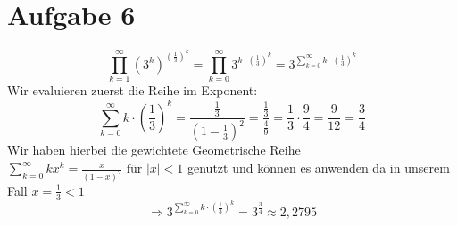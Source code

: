 \section{Aufgabe 6}
$$\prod_{k=1}^{\infty}(3^{k})^{(\frac{1}{3})^k}=\prod_{k=0}^{\infty}3^{k\cdot(\frac{1}{3})^k}=3^{\sum_{k=0}^{\infty}k\cdot(\frac{1}{3})^k}$$
Wir evaluieren zuerst die Reihe im Exponent:
$$\sum_{k=0}^{\infty}k\cdot(\frac{1}{3})^k=\frac{\frac{1}{3}}{(1-\frac{1}{3})^2}=\frac{\frac{1}{3}}{\frac{4}{9}}=\frac{1}{3}\cdot \frac{9}{4}=\frac{9}{12}=\frac{3}{4}$$
Wir haben hierbei die gewichtete Geometrische Reihe $\sum_{k=0}^{\infty}kx^k=\frac{x}{(1-x)^2} \text{ für } |x| < 1$ genutzt und können es anwenden da in unserem Fall $x=\frac{1}{3}<1$
$$\Rightarrow 3^{\sum_{k=0}^{\infty}k\cdot(\frac{1}{3})^k}=3^{\frac{3}{4}}\approx2,2795$$